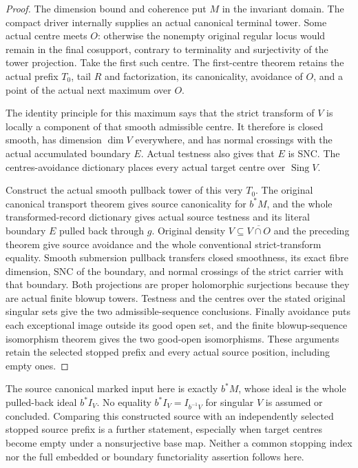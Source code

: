 \begin{proof}
The dimension bound and coherence put $M$ in the invariant domain.  The
compact driver internally supplies an actual canonical terminal tower.
Some actual centre meets $O$: otherwise the nonempty original regular
locus would remain in the final cosupport, contrary to terminality and
surjectivity of the tower projection.  Take the first such centre.  The
first-centre theorem retains the actual prefix $T_0$, tail $R$ and
factorization, its canonicality, avoidance of $O$, and a point of the
actual next maximum over $O$.

The identity principle for this maximum says that the strict transform
of $V$ is locally a component of that smooth admissible centre.  It
therefore is closed smooth, has dimension $\dim V$ everywhere, and has
normal crossings with the actual accumulated boundary $E$.  Actual
testness also gives that $E$ is SNC.  The centres-avoidance dictionary
places every actual target centre over $\operatorname{Sing}V$.

Construct the actual smooth pullback tower of this very $T_0$.  The
original canonical transport theorem gives source canonicality for
$b^*M$, and the whole transformed-record dictionary gives actual source
testness and its literal boundary $E$ pulled back through $g$.  Original
density $V\subseteq\overline{V\cap O}$ and the preceding theorem give
source avoidance and the whole conventional strict-transform equality.
Smooth submersion pullback transfers closed smoothness, its exact fibre
dimension, SNC of the boundary, and normal crossings of the strict carrier
with that boundary.  Both projections are proper holomorphic surjections
because they are actual finite blowup towers.  Testness and the centres
over the stated original singular sets give the two admissible-sequence
conclusions.  Finally avoidance puts each exceptional image outside its
good open set, and the finite blowup-sequence isomorphism theorem gives
the two good-open isomorphisms.  These arguments retain the selected
stopped prefix and every actual source position, including empty ones.
\end{proof}

\begin{remark}
The source canonical marked input here is exactly $b^*M$, whose ideal is
the whole pulled-back ideal $b^*I_V$.  No equality
$b^*I_V=I_{b^{-1}V}$ for singular $V$ is assumed or concluded.  Comparing
this constructed source with an independently selected stopped source
prefix is a further statement, especially when target centres become
empty under a nonsurjective base map.  Neither a common stopping index
nor the full embedded or boundary functoriality assertion follows here.
\end{remark}
